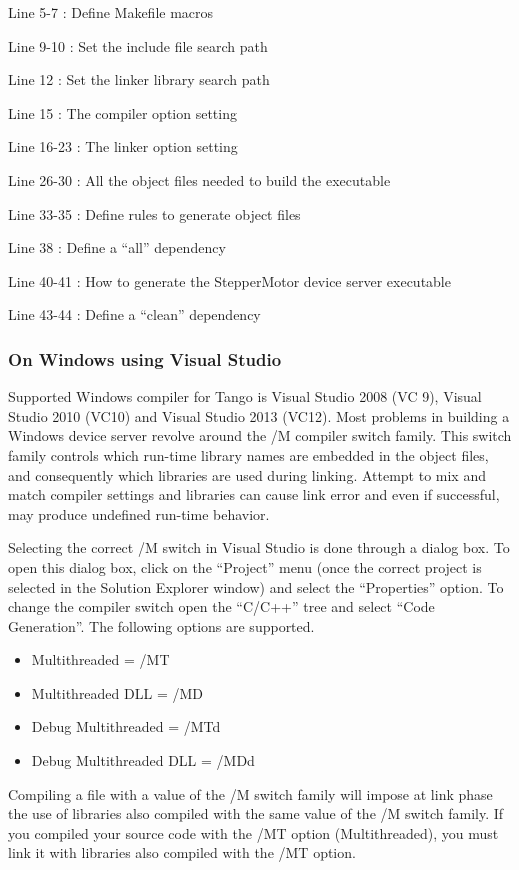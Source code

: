 Line 5-7 : Define Makefile macros

Line 9-10 : Set the include file search path

Line 12 : Set the linker library search path

Line 15 : The compiler option setting

Line 16-23 : The linker option setting

Line 26-30 : All the object files needed to build the executable

Line 33-35 : Define rules to generate object files

Line 38 : Define a ``all'' dependency

Line 40-41 : How to generate the StepperMotor device server executable

Line 43-44 : Define a ``clean'' dependency


\subsubsection{On Windows using Visual Studio\label{Compiling NT}}

Supported Windows compiler for Tango is Visual Studio
2008 (VC 9), Visual Studio 2010 (VC10) and Visual Studio 2013 (VC12).
Most problems in building a Windows device server revolve around the
/M compiler switch family. This switch family controls which run-time
library names are embedded in the object files, and consequently which
libraries are used during linking. Attempt to mix
and match compiler settings and libraries can cause link error and
even if successful, may produce undefined run-time behavior.

Selecting the correct /M switch in Visual Studio is done through a
dialog box. To open this dialog box, click on the ``Project'' menu
(once the correct project is selected in the Solution Explorer window)
and select the ``Properties'' option. To change the compiler switch
open the ``C/C++'' tree and select ``Code Generation''. The following
options are supported.
\begin{itemize}
\item Multithreaded = /MT
\item Multithreaded DLL = /MD
\item Debug Multithreaded = /MTd
\item Debug Multithreaded DLL = /MDd
\end{itemize}
Compiling a file with a value of the /M switch family will impose
at link phase the use of libraries also compiled with the same value
of the /M switch family. If you compiled your source code with the
/MT option (Multithreaded), you must link it with libraries also compiled
with the /MT option.

